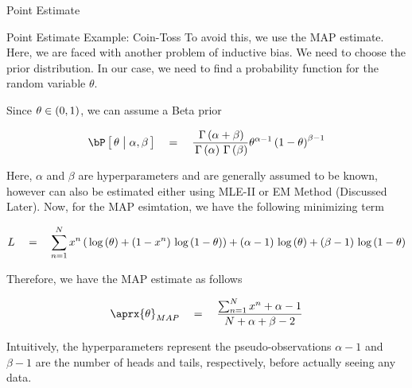 \documentclass{article}
\begin{document}
\begin{ssection}{Point Estimate}
\begin{ssubsection}{Point Estimate Example: Coin-Toss}
		To avoid this, we use the MAP estimate. Here, we are faced with another problem of inductive bias. We need to choose the prior distribution. In our case, we need to find a probability function for the random variable $\theta$. \br

		Since $\theta \in \left( {0, 1} \right)$, we can assume a Beta prior

		\begin{align*}
			\prob{\theta \pipe \alpha, \beta}	\eq	\frac{\func{\Gamma}{\alpha + \beta}}{\func{\Gamma}{\alpha} \func{\Gamma}{\beta}} \theta^{\alpha - 1} \para{1 - \theta}^{\beta - 1}
		\end{align*}

		Here, $\alpha$ and $\beta$ are hyperparameters and are generally assumed to be known, however can also be estimated either using MLE-II or EM Method (Discussed Later). Now, for the MAP esimtation, we have the following minimizing term

		\begin{align*}
			L	\eq	\sum_{n = 1}^N x^n \para{\log{\theta} + \para{1 - x^n} \log{1 - \theta}} + \para{\alpha - 1} \log{\theta} + \para{\beta - 1} \log{1 - \theta}
		\end{align*}

		Therefore, we have the MAP estimate as follows

		\begin{align*}
			\aprx{\theta}_{MAP}	\eq	\frac{\sum_{n = 1}^N x^n + \alpha - 1}{N + \alpha + \beta - 2}
		\end{align*}

		Intuitively, the hyperparameters represent the pseudo-observations  $\alpha - 1$ and $\beta - 1$ are the number of heads and tails, respectively, before actually seeing any data.

	\end{ssubsection}

\end{ssection}
\end{document}
